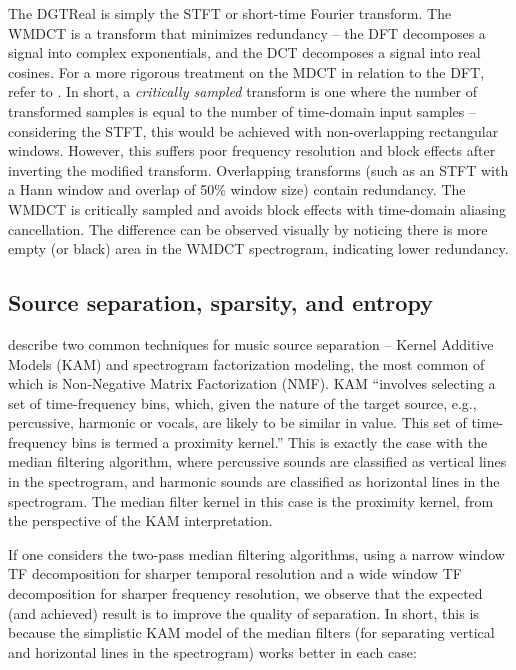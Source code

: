 \documentclass[letter,12pt]{article}
\begin{document}
The DGTReal is simply the STFT or short-time Fourier transform. The WMDCT is a transform that minimizes redundancy -- the DFT decomposes a signal into complex exponentials, and the DCT decomposes a signal into real cosines. For a more rigorous treatment on the MDCT in relation to the DFT, refer to \cite{mdct}. In short, a \textit{critically sampled} transform is one where the number of transformed samples is equal to the number of time-domain input samples -- considering the STFT, this would be achieved with non-overlapping rectangular windows. However, this suffers poor frequency resolution and block effects after inverting the modified transform. Overlapping transforms (such as an STFT with a Hann window and overlap of 50\% window size) contain redundancy. The WMDCT is critically sampled and avoids block effects with time-domain aliasing cancellation. The difference can be observed visually by noticing there is more empty (or black) area in the WMDCT spectrogram, indicating lower redundancy.

\clearpage
\vfill

\subsection{Source separation, sparsity, and entropy}
\label{sec:theorysparsity}

\citet{musicsepgood} describe two common techniques for music source separation -- Kernel Additive Models (KAM) and spectrogram factorization modeling, the most common of which is Non-Negative Matrix Factorization (NMF). KAM ``involves selecting a set of time-frequency bins, which, given the nature of the target source, e.g., percussive, harmonic or vocals, are likely to be similar in value. This set of time-frequency bins is termed a proximity kernel.'' This is exactly the case with the median filtering algorithm, where percussive sounds are classified as vertical lines in the spectrogram, and harmonic sounds are classified as horizontal lines in the spectrogram. The median filter kernel in this case is the proximity kernel, from the perspective of the KAM interpretation.

If one considers the two-pass median filtering algorithms, using a narrow window TF decomposition for sharper temporal resolution and a wide window TF decomposition for sharper frequency resolution, we observe that the expected (and achieved) result is to improve the quality of separation. In short, this is because the simplistic KAM model of the median filters (for separating vertical and horizontal lines in the spectrogram) works better in each case:
\end{document}
